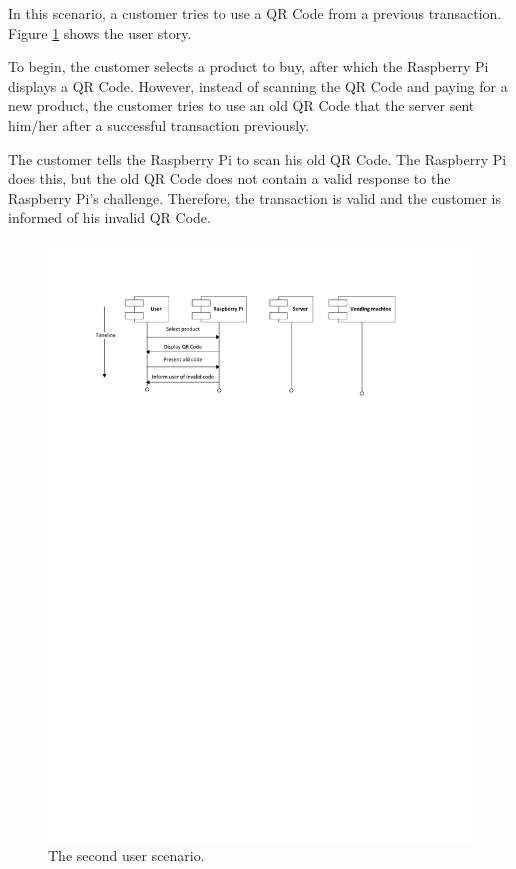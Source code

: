 In this scenario, a customer tries to use a QR Code from a previous transaction. Figure
\ref{fig:test2} shows the user story.

To begin, the customer selects a product to buy, after which the Raspberry Pi displays a
QR Code. However, instead of scanning the QR Code and paying for a new product, the
customer tries to use an old QR Code that the server sent him/her after a successful
transaction previously. 

The customer tells the Raspberry Pi to scan his old QR Code. The Raspberry Pi does
this, but the old QR Code does not contain a valid response to the Raspberry Pi's
challenge. Therefore, the transaction is valid and the customer is informed of his
invalid QR Code.

\begin{figure}
 \centering 
 \includegraphics[clip=true, trim = 0 620 0 50,
 scale=0.7]{user_story_2}
 \caption{The second user scenario.}
 \label{fig:test2}
\end{figure}

